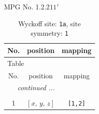 \documentclass[fleqn,8pt]{jsarticle}
\begin{document}
\setcounter{MaxMatrixCols}{32}

\renewcommand{\tablename}{Table~}
\renewcommand{\figurename}{Figure~}
\begin{center}
\LARGE
MPG No. 1.2.2\quad$11'$
\end{center}
\renewcommand{\arraystretch}{1.2}
\begin{longtable}{ccc}
\caption{Wyckoff site: {\tt 1a}, site symmetry: {\tt 1}}
 \\
 \hline \hline
No. & position & mapping \\ \hline \endfirsthead

\multicolumn{2}{l}{\tablename\ \thetable{}} \\
 \hline \hline
No. & position & mapping \\ \hline \endhead

 \hline \hline
\multicolumn{2}{r}{\footnotesize\it continued ...} \\ \endfoot

 \hline \hline
\multicolumn{2}{r}{} \\ \endlastfoot

1 & $\left[ x,\, y,\, z \right]$ & {\tt [1,2]} \\
\end{longtable}
\end{document}
